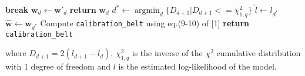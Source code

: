 \documentclass[10pt]{article}
\DeclareMathOperator*{\argmin}{argmin}
\begin{document}
\begin{algorithm}
\begin{algorithmic}[1]
                          \EndFor
                                  \State \textbf{break}
                          \EndIf
                          \State $\mathbf{w}_d \gets \mathbf{w'}_d$ 
                          \State \textbf{return} $\mathbf{w}_d$
                  \EndProcedure
          \EndLoop
               \State $d^* \gets \argmin_d \{ D_{d+1} | D_{d+1} <= \chi_{1, q}^2 \}$ 
                \State $\hat{l} \gets l_{d^*}$
                \State $\hat{\mathbf{w}} \gets \mathbf{w}_{d^*} $
                \State Compute \texttt{calibration\_belt} using eq.(9-10) of [1]
                \State \textbf{return} \texttt{calibration\_belt}
          \EndProcedure
  \end{algorithmic}

\end{algorithm}
        
where $D_{d+1} = 2 (l_{d+1} - l_d)$, $\chi_{1, q}^2$ is the inverse  of the $\chi^2$ 
cumulative distribution with 1 degree of freedom and $l$ is the estimated log-likelihood 
of the model.
\end{document}
